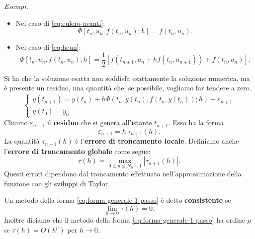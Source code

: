 \textit{Esempi.}
\begin{itemize}
\item Nel caso di \eqref{eq:eulero-avanti}:
\begin{equation*}
\Phi [ t_{n} ,u_{n} ,f( t_{n} ,u_{n}) ;h] =f( t_{n} ,u_{n}).
\end{equation*}
\item Nel caso di \eqref{eq:heun}:
\begin{equation*}
\Phi [ t_{n} ,u_{n} ,f( t_{n} ,u_{n}) ;h] =\frac{1}{2}[ f( t_{n+1} ,u_{n} +hf( t_{n} ,u_{n+1})) +f( t_{n} ,u_{n})].
\end{equation*}
\end{itemize}

Si ha che la soluzione esatta non soddisfa esattamente la soluzione numerica, ma è presente un residuo, una quantità che, se possibile, vogliamo far tendere a zero.
\begin{equation*}
\begin{cases}
y( t_{n+1}) =y( t_{n}) +h\Phi ( t_{n} ,y( t_{n}) ,f( t_{n} ,y( t_{n})) ;h) +\varepsilon _{n+1}\\
y( t_{0}) =y_{0}.
\end{cases}
\end{equation*}
Chiamo $\varepsilon _{n+1}$ il \textbf{residuo} che si genera all'istante $t_{n+1}$. Esso ha la forma
\begin{equation*}
\varepsilon _{n+1} =h\ \tau _{n+1}(h) .
\end{equation*}
La quantità $\tau _{n+1}(h)$ è l'\textbf{errore di troncamento locale}. Definiamo anche l'\textbf{errore di troncamento globale} come segue:
\begin{equation*}
\tau (h) =\max_{0\leqslant n\leqslant N_{h} -1}| \tau _{n+1}(h)|.
\end{equation*}
Questi errori dipendono dal troncamento effettuato nell'approssimazione della funzione con gli sviluppi di Taylor.
\begin{definition}
Un metodo della forma \eqref{eq:forma-generale-1-passo} è detto \textbf{consistente} se
\begin{equation*}
\lim _{h\rightarrow 0} \tau (h) =0.
\end{equation*}
Inoltre diciamo che il metodo della forma \eqref{eq:forma-generale-1-passo} ha ordine $p$ se $\tau (h) =O\left( h^{p}\right)$ per $h\rightarrow 0$.
\end{definition}

